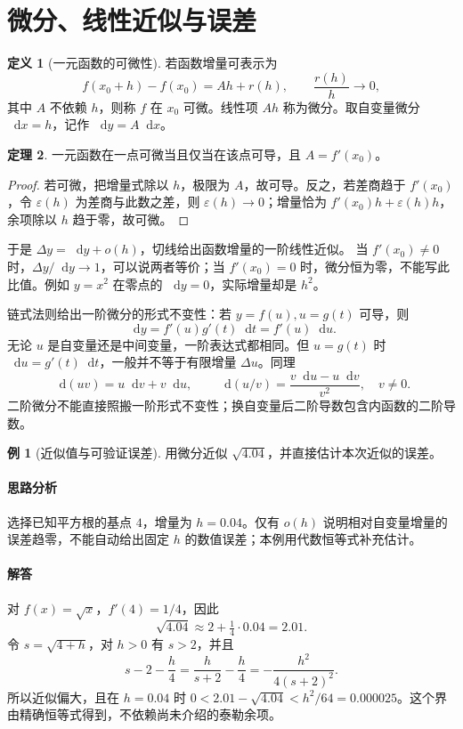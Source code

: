 \documentclass[UTF8,fontset=fandol,12pt,oneside,openany]{ctexrep}
\newcommand{\dd}{\mathop{}\!\mathrm d}
\theoremstyle{definition}
\newtheorem{theorem}{定理}[chapter]
\newtheorem{definition}[theorem]{定义}
\newtheorem{example}{例}[chapter]
\begin{document}
\section{微分、线性近似与误差}
\label{lec:05:differential}

\begin{definition}[一元函数的可微性]
若函数增量可表示为
\[
 f(x_0+h)-f(x_0)=Ah+r(h),\qquad\frac{r(h)}h\to0,
\]
其中 $A$ 不依赖 $h$，则称 $f$ 在 $x_0$ 可微。线性项 $Ah$ 称为微分。取自变量微分 $\dd x=h$，记作 $\dd y=A\dd x$。
\end{definition}

\begin{theorem}
一元函数在一点可微当且仅当在该点可导，且 $A=f'(x_0)$。
\end{theorem}
\begin{proof}
若可微，把增量式除以 $h$，极限为 $A$，故可导。反之，若差商趋于 $f'(x_0)$，令 $\varepsilon(h)$ 为差商与此数之差，则 $\varepsilon(h)\to0$；增量恰为 $f'(x_0)h+\varepsilon(h)h$，余项除以 $h$ 趋于零，故可微。
\end{proof}

于是 $\Delta y=\dd y+o(h)$，切线给出函数增量的一阶线性近似。
当 $f'(x_0)\ne0$ 时，$\Delta y/\dd y\to1$，可以说两者等价；当 $f'(x_0)=0$ 时，微分恒为零，不能写此比值。例如 $y=x^2$ 在零点的 $\dd y=0$，实际增量却是 $h^2$。

链式法则给出一阶微分的形式不变性：若 $y=f(u),u=g(t)$ 可导，则
\[
 \dd y=f'(u)g'(t)\dd t=f'(u)\dd u.
\]
无论 $u$ 是自变量还是中间变量，一阶表达式都相同。但 $u=g(t)$ 时 $\dd u=g'(t)\dd t$，一般并不等于有限增量 $\Delta u$。同理
\[
 \dd(uv)=u\dd v+v\dd u,\qquad
 \dd(u/v)=\frac{v\dd u-u\dd v}{v^2},\quad v\ne0.
\]
二阶微分不能直接照搬一阶形式不变性；换自变量后二阶导数包含内函数的二阶导数。

\begin{example}[近似值与可验证误差]
用微分近似 $\sqrt{4.04}$，并直接估计本次近似的误差。
\end{example}
\paragraph{思路分析}选择已知平方根的基点 $4$，增量为 $h=0.04$。仅有 $o(h)$ 说明相对自变量增量的误差趋零，不能自动给出固定 $h$ 的数值误差；本例用代数恒等式补充估计。
\paragraph{解答}对 $f(x)=\sqrt{x}$，$f'(4)=1/4$，因此
\[
 \sqrt{4.04}\approx2+\tfrac14\cdot0.04=2.01.
\]
令 $s=\sqrt{4+h}$，对 $h>0$ 有 $s>2$，并且
\[
 s-2-\frac h4
 =\frac h{s+2}-\frac h4
 =-\frac{h^2}{4(s+2)^2}.
\]
所以近似偏大，且在 $h=0.04$ 时
$0<2.01-\sqrt{4.04}<h^2/64=0.000025$。这个界由精确恒等式得到，不依赖尚未介绍的泰勒余项。
\end{document}
